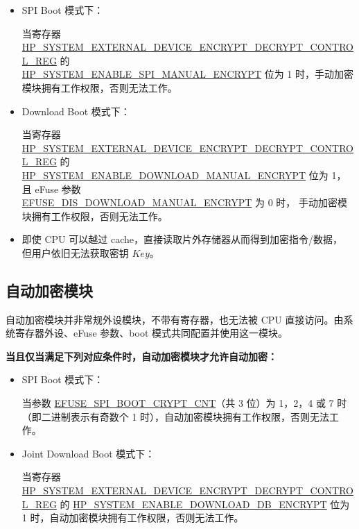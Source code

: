 \documentclass[main\_\_CN.tex]{subfiles}
\begin{document}
\begin{itemize}

    \item SPI Boot 模式下：

    当寄存器 \hyperref[regdesc:HPSYSTEMEXTERNALDEVICEENCRYPTDECRYPTCONTROLREG]{HP\_SYSTEM\_EXTERNAL\_DEVICE\_ENCRYPT\_DECRYPT\_CONTROL\_REG} 的 \\ \hyperref[fielddesc:HPSYSTEMENABLESPIMANUALENCRYPT]{HP\_SYSTEM\_ENABLE\_SPI\_MANUAL\_ENCRYPT} 位为 1 时，手动加密模块拥有工作权限，否则无法工作。

    \item Download Boot 模式下：

    当寄存器 \hyperref[regdesc:HPSYSTEMEXTERNALDEVICEENCRYPTDECRYPTCONTROLREG]{HP\_SYSTEM\_EXTERNAL\_DEVICE\_ENCRYPT\_DECRYPT\_CONTROL\_REG} 的\\ \hyperref[fielddesc:HPSYSTEMENABLEDOWNLOADMANUALENCRYPT]{HP\_SYSTEM\_ENABLE\_DOWNLOAD\_MANUAL\_ENCRYPT} 位为 1，且 eFuse 参数\\ \hyperref[fielddesc:EFUSEDISDOWNLOADMANUALENCRYPT]{EFUSE\_DIS\_DOWNLOAD\_MANUAL\_ENCRYPT} 为 0 时，
    手动加密模块拥有工作权限，否则无法工作。

\end{itemize}

\begin{tiplisting}
\vspace{-2em}
\begin{itemize}
\item 即使 CPU 可以越过 cache，直接读取片外存储器从而得到加密指令/数据，
但用户依旧无法获取密钥 \begin{math}\mathit{Key}\end{math}。
\end{itemize}
\end{tiplisting}

\subsection{自动加密模块}

自动加密模块并非常规外设模块，不带有寄存器，也无法被 CPU 直接访问。由系统寄存器外设、eFuse 参数、boot 模式共同配置并使用这一模块。

\textbf{当且仅当满足下列对应条件时，自动加密模块才允许自动加密：}

\begin{itemize}

    \item SPI Boot 模式下：

    当参数 \hyperref[fielddesc:EFUSESPIBOOTCRYPTCNT]{EFUSE\_SPI\_BOOT\_CRYPT\_CNT}（共 3 位）为 1，2，4 或 7 时（即二进制表示有奇数个 1 时），自动加密模块拥有工作权限，否则无法工作。

    \item Joint Download Boot 模式下：

    当寄存器 \hyperref[regdesc:HPSYSTEMEXTERNALDEVICEENCRYPTDECRYPTCONTROLREG]{HP\_SYSTEM\_EXTERNAL\_DEVICE\_ENCRYPT\_DECRYPT\_CONTROL\_REG} 的 \hyperref[fielddesc:HPSYSTEMENABLEDOWNLOADDBENCRYPT]{HP\_SYSTEM\_ENABLE\_DOWNLOAD\_DB\_ENCRYPT} 位为 1 时，自动加密模块拥有工作权限，否则无法工作。

\end{itemize}
\end{document}
